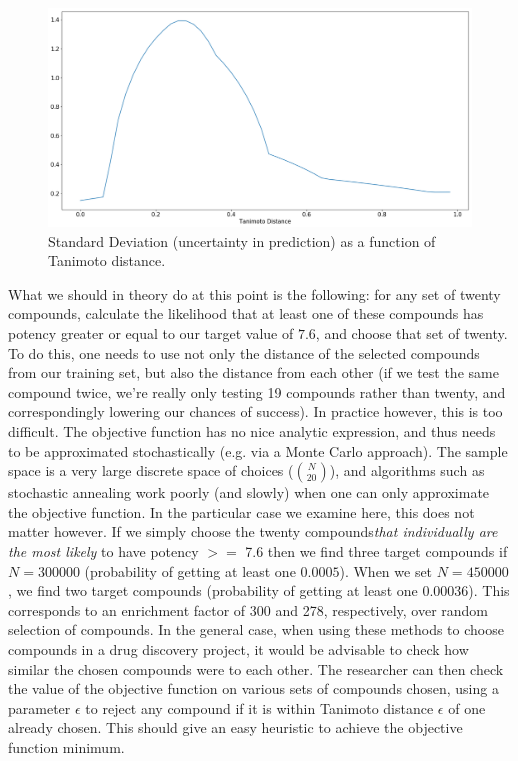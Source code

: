 \documentclass[journal=jacsat,manuscript=article]{achemso}
\begin{document}
\begin{figure}[h!]
\centering
\includegraphics[width=\textwidth]{fig9.png}
\caption{Standard Deviation (uncertainty in prediction) as a function of Tanimoto distance.}
\label{fig:9}
\end{figure}

What we should in theory do at this point is the following: for any set of twenty compounds, calculate the likelihood that at least one of these compounds has potency greater or equal to our target value of $7.6$, and choose that set of twenty.  To do this, one needs to use not only the distance of the selected compounds from our training set, but also the distance from each other (if we test the same compound twice, we're really only testing 19 compounds rather than twenty, and correspondingly lowering our chances of success).
\newline
\newline
In practice however, this is too difficult. The objective function has no nice analytic expression, and thus needs to be approximated stochastically (e.g. via a Monte Carlo approach).  The sample space is a very large discrete space of choices (${N}\choose{20}$), and algorithms such as stochastic annealing work poorly (and slowly) when one can only approximate the objective function.
In the particular case we examine here, this does not matter however.  If we simply choose the twenty compounds\textit{that individually are the most likely} to have potency $>=$ 7.6 then 
we find three target compounds if $N=300000$ (probability of getting at least one $0.0005$).
When we set $N=450000$, we find two target compounds (probability of getting at least one $0.00036$). 
This corresponds to an enrichment factor of 300 and 278, respectively, over random selection of compounds.  In the general case, when using these methods to choose compounds in a drug discovery project, it would be advisable to check how similar the chosen compounds were to each other.  The researcher can then check the value of the objective function on various sets of compounds chosen, using a parameter $\epsilon$ to reject any compound if it is within Tanimoto distance $\epsilon$ of one already chosen.  This should give an easy heuristic to achieve the objective function minimum.
\end{document}
